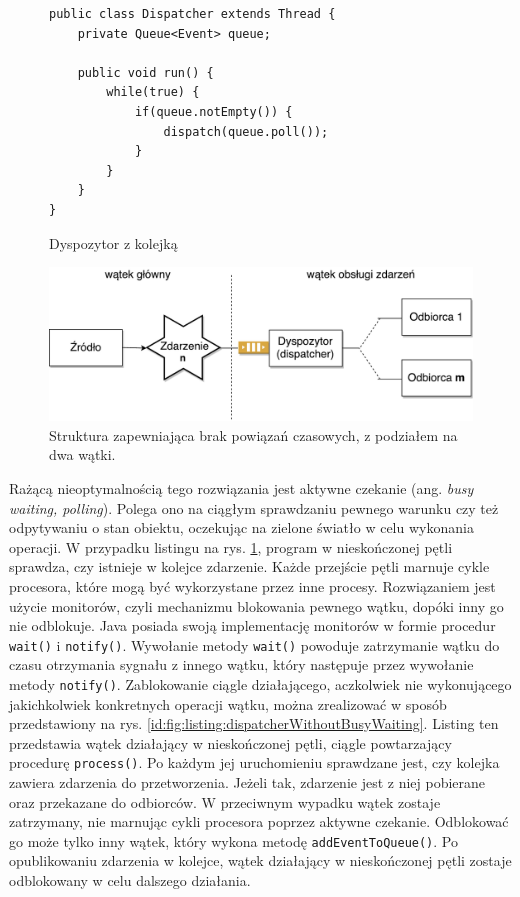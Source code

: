\documentclass[a4paper]{book}
\newcommand{\obcy}[2]{{\selectlanguage{#1}#2}}
\newcommand{\ang}[1]{\emph{\obcy{british}{#1}}}
\begin{document}
{\begin{figure}
\begin{lstlisting}
public class Dispatcher extends Thread {
	private Queue<Event> queue;
	
	public void run() {
		while(true) {
			if(queue.notEmpty()) {
				dispatch(queue.poll());
			}
		}
	}
}
\end{lstlisting}
\caption{Dyspozytor z kolejką}
\label{id:fig:listing:dispatcher}
\end{figure}

\begin{figure}
	\centering
	\includegraphics[width=1.0\textwidth]{./img/EDA_AsyncDispatcher.pdf}
	\caption{Struktura zapewniająca brak powiązań czasowych, z podziałem na dwa wątki.}
	\label{id:fig:3}
\end{figure}

Rażącą nieoptymalnością tego rozwiązania jest aktywne czekanie (ang. \ang{busy waiting, polling}). Polega ono na ciągłym sprawdzaniu pewnego warunku czy też odpytywaniu o stan obiektu, oczekując na zielone światło w celu wykonania operacji. W przypadku listingu na rys. \ref{id:fig:listing:dispatcher}, program w nieskończonej pętli sprawdza, czy istnieje w kolejce zdarzenie. Każde przejście pętli marnuje cykle procesora, które mogą być wykorzystane przez inne procesy. Rozwiązaniem jest użycie monitorów, czyli mechanizmu blokowania pewnego wątku, dopóki inny go nie odblokuje. Java posiada swoją implementację monitorów w formie procedur \lstinline|wait()| i \lstinline|notify()|. Wywołanie metody \lstinline|wait()| powoduje zatrzymanie wątku do czasu otrzymania sygnału z innego wątku, który następuje przez wywołanie metody \lstinline|notify()|. Zablokowanie ciągle działającego, aczkolwiek nie wykonującego jakichkolwiek konkretnych operacji wątku, można zrealizować w sposób przedstawiony na rys. \ref{id:fig:listing:dispatcherWithoutBusyWaiting}. Listing ten przedstawia wątek działający w nieskończonej pętli, ciągle powtarzający procedurę \lstinline|process()|. Po każdym jej uruchomieniu sprawdzane jest, czy kolejka zawiera zdarzenia do przetworzenia. Jeżeli tak, zdarzenie jest z niej pobierane oraz przekazane do odbiorców. W przeciwnym wypadku wątek zostaje zatrzymany, nie marnując cykli procesora poprzez aktywne czekanie. Odblokować go może tylko inny wątek, który wykona metodę \lstinline|addEventToQueue()|. Po opublikowaniu zdarzenia w kolejce, wątek działający w nieskończonej pętli zostaje odblokowany w celu dalszego działania.

}
\end{document}
